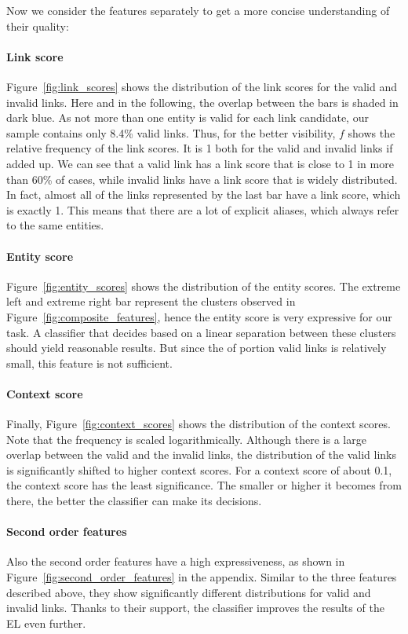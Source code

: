 Now we consider the features separately to get a more concise understanding of their quality:

\paragraph{Link score}
Figure~\ref{fig:link_scores} shows the distribution of the link scores for the valid and invalid links. Here and in the following, the overlap between the bars is shaded in dark blue. As not more than one entity is valid for each link candidate, our sample contains only 8.4\% valid links. Thus, for the better visibility, $f$ shows the relative frequency of the link scores. It is 1 both for the valid and invalid links if added up. We can see that a valid link has a link score that is close to 1 in more than 60\% of cases, while invalid links have a link score that is widely distributed. In fact, almost all of the links represented by the last bar have a link score, which is exactly 1. This means that there are a lot of explicit aliases, which always refer to the same entities. 

\paragraph{Entity score}
Figure~\ref{fig:entity_scores} shows the distribution of the entity scores. The extreme left and extreme right bar represent the clusters observed in Figure~\ref{fig:composite_features}, hence the entity score is very expressive for our task. A classifier that decides based on a linear separation between these clusters should yield reasonable results. But since the of portion valid links is relatively small, this feature is not sufficient.

\paragraph{Context score}
Finally, Figure~\ref{fig:context_scores} shows the distribution of the context scores. Note that the frequency is scaled logarithmically. Although there is a large overlap between the valid and the invalid links, the distribution of the valid links is significantly shifted to higher context scores. For a context score of about 0.1, the context score has the least significance. The smaller or higher it becomes from there, the better the classifier can make its decisions.

\paragraph{Second order features}
Also the second order features have a high expressiveness, as shown in Figure~\ref{fig:second_order_features} in the appendix. Similar to the three features described above, they show significantly different distributions for valid and invalid links. Thanks to their support, the classifier improves the results of the EL even further.



